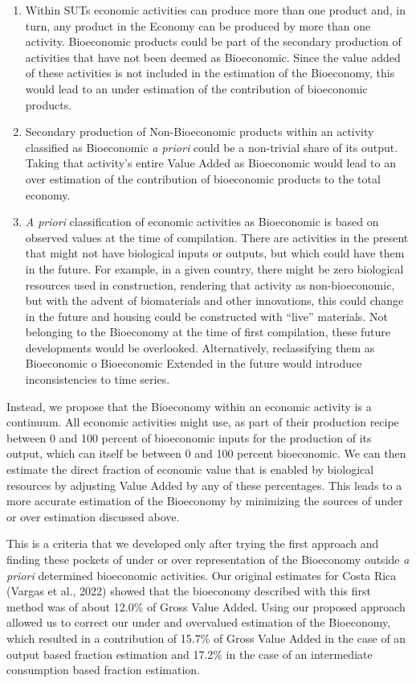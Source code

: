 \documentclass[
  letterpaper,
  DIV=11,
  numbers=noendperiod]{scrartcl}
\providecommand{\tightlist}{%
  \setlength{\itemsep}{0pt}\setlength{\parskip}{0pt}}\usepackage{longtable,booktabs,array}
\begin{document}
\begin{enumerate}
\def\labelenumi{\arabic{enumi}.}
\tightlist
\item
  Within SUTs economic activities can produce more than one product and,
  in turn, any product in the Economy can be produced by more than one
  activity. Bioeconomic products could be part of the secondary
  production of activities that have not been deemed as Bioeconomic.
  Since the value added of these activities is not included in the
  estimation of the Bioeconomy, this would lead to an under estimation
  of the contribution of bioeconomic products.
\item
  Secondary production of Non-Bioeconomic products within an activity
  classified as Bioeconomic \emph{a priori} could be a non-trivial share
  of its output. Taking that activity's entire Value Added as
  Bioeconomic would lead to an over estimation of the contribution of
  bioeconomic products to the total economy.
\item
  \emph{A priori} classification of economic activities as Bioeconomic
  is based on observed values at the time of compilation. There are
  activities in the present that might not have biological inputs or
  outputs, but which could have them in the future. For example, in a
  given country, there might be zero biological resources used in
  construction, rendering that activity as non-bioeconomic, but with the
  advent of biomaterials and other innovations, this could change in the
  future and housing could be constructed with ``live'' materials. Not
  belonging to the Bioeconomy at the time of first compilation, these
  future developments would be overlooked. Alternatively, reclassifying
  them as Bioeconomic o Bioeconomic Extended in the future would
  introduce inconsistencies to time series.
\end{enumerate}

Instead, we propose that the Bioeconomy within an economic activity is a
continuum. All economic activities might use, as part of their
production recipe between 0 and 100 percent of bioeconomic inputs for
the production of its output, which can itself be between 0 and 100
percent bioeconomic. We can then estimate the direct fraction of
economic value that is enabled by biological resources by adjusting
Value Added by any of these percentages. This leads to a more accurate
estimation of the Bioeconomy by minimizing the sources of under or over
estimation discussed above.

This is a criteria that we developed only after trying the first
approach and finding these pockets of under or over representation of
the Bioeconomy outside \emph{a priori} determined bioeconomic
activities. Our original estimates for Costa Rica (Vargas et al., 2022)
showed that the bioeconomy described with this first method was of about
12.0\% of Gross Value Added. Using our proposed approach allowed us to
correct our under and overvalued estimation of the Bioeconomy, which
resulted in a contribution of 15.7\% of Gross Value Added in the case of
an output based fraction estimation and 17.2\% in the case of an
intermediate consumption based fraction estimation.
\end{document}
